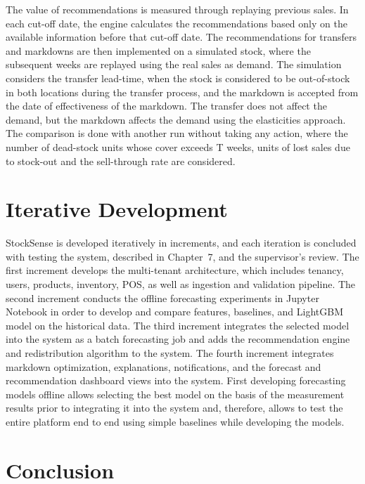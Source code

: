\documentclass{StockSense}
\begin{document}
The value of recommendations is measured through replaying previous sales. In each cut-off date, the engine calculates the recommendations based only on the available information before that cut-off date. The recommendations for transfers and markdowns are then implemented on a simulated stock, where the subsequent weeks are replayed using the real sales as demand. The simulation considers the transfer lead-time, when the stock is considered to be out-of-stock in both locations during the transfer process, and the markdown is accepted from the date of effectiveness of the markdown. The transfer does not affect the demand, but the markdown affects the demand using the elasticities approach. The comparison is done with another run without taking any action, where the number of dead-stock units whose cover exceeds T weeks, units of lost sales due to stock-out and the sell-through rate are considered.

\section{Iterative Development}
\label{sec:iterative}

StockSense is developed iteratively in increments, and each iteration is concluded with testing the system, described in Chapter~7, and the supervisor's review. The first increment develops the multi-tenant architecture, which includes tenancy, users, products, inventory, POS, as well as ingestion and validation pipeline. The second increment conducts the offline forecasting experiments in Jupyter Notebook in order to develop and compare features, baselines, and LightGBM model on the historical data. The third increment integrates the selected model into the system as a batch forecasting job and adds the recommendation engine and redistribution algorithm to the system. The fourth increment integrates markdown optimization, explanations, notifications, and the forecast and recommendation dashboard views into the system. First developing forecasting models offline allows selecting the best model on the basis of the measurement results prior to integrating it into the system and, therefore, allows to test the entire platform end to end using simple baselines while developing the models.

\section{Conclusion}
\label{sec:conclusion}
\end{document}
